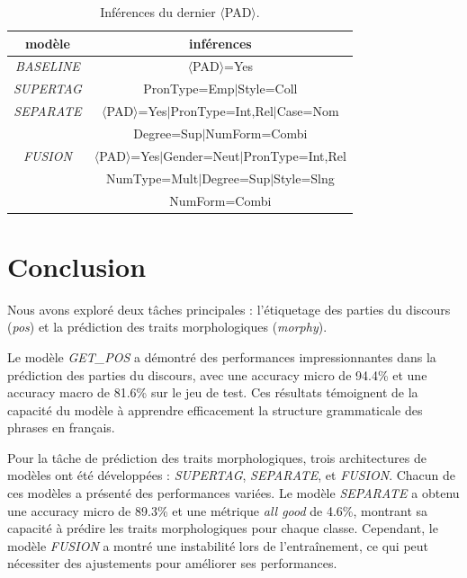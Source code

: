 \documentclass[a4paper]{article}
\begin{document}
\begin{table}[H]
    \centering
    \begin{tabular}{|c|c|}
        \hline
        \textbf{modèle} & \textbf{inférences} \\
        \hline
        \textit{BASELINE} & $\langle$PAD$\rangle$=Yes \\
        \hline
        \textit{SUPERTAG} & PronType=Emp$\mid$Style=Coll\\
        \hline
        \textit{SEPARATE} & $\langle$PAD$\rangle$=Yes$\mid$PronType=Int,Rel$\mid$Case=Nom\\
            & Degree=Sup$\mid$NumForm=Combi\\
        \hline
        \textit{FUSION} & $\langle$PAD$\rangle$=Yes$\mid$Gender=Neut$\mid$PronType=Int,Rel\\
            & NumType=Mult$\mid$Degree=Sup$\mid$Style=Slng\\
            & NumForm=Combi\\
        \hline
    \end{tabular}
    \caption{Inférences du dernier $\langle$PAD$\rangle$.}
\end{table}

\section{Conclusion}

Nous avons exploré deux tâches principales : l'étiquetage des parties du discours (\textit{pos}) et la prédiction des traits
morphologiques (\textit{morphy}). 

Le modèle \textit{GET\_POS} a démontré des performances impressionnantes dans la prédiction des parties du discours, avec une
accuracy micro de 94.4\% et une accuracy macro de 81.6\% sur le jeu de test. Ces résultats témoignent de la capacité du modèle
à apprendre efficacement la structure grammaticale des phrases en français.

Pour la tâche de prédiction des traits morphologiques, trois architectures de modèles ont été développées : \textit{SUPERTAG},
\textit{SEPARATE}, et \textit{FUSION}. Chacun de ces modèles a présenté des performances variées. Le modèle \textit{SEPARATE} a
obtenu une accuracy micro de 89.3\% et une métrique \textit{all good} de 4.6\%, montrant sa capacité à prédire les traits
morphologiques pour chaque classe. Cependant, le modèle \textit{FUSION} a montré une instabilité lors de l'entraînement, ce
qui peut nécessiter des ajustements pour améliorer ses performances.
\end{document}
